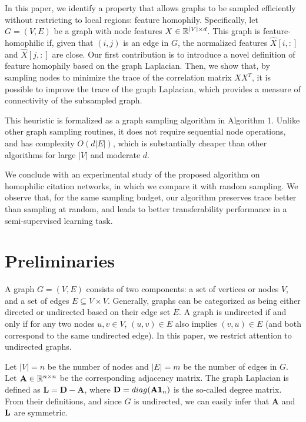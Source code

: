 \documentclass[conference]{IEEEtran}
\theoremstyle{definition}
\begin{document}
In this paper, we identify a property that allows graphs to be sampled efficiently without restricting to local regions: feature homophily. Specifically, let $G=(V,E)$ be a graph with node features $X \in {\mathbb R}^{|V| \times d}$. This graph is feature-homophilic if, given that $(i,j)$ is an edge in $G$, the normalized features $\hat{X}[i,:]$ and $\hat{X}[j,:]$ are close. Our first contribution is to introduce a novel definition of feature homophily based on the graph Laplacian. Then, we show that, by sampling nodes to minimize the trace of the correlation matrix $XX^T$, it is possible to improve the trace of the graph Laplacian, which provides a measure of connectivity of the subsampled graph. 

This heuristic is formalized as a graph sampling algorithm in Algorithm 1. Unlike other graph sampling routines, it does not require sequential node operations, and has complexity $O(d|E|)$, which is substantially cheaper than other algorithms for large $|V|$ and moderate $d$. 

We conclude with an experimental study of the proposed algorithm on homophilic citation networks, in which we compare it with random sampling. We observe that, for the same sampling budget, our algorithm preserves trace better than sampling at random, and leads to better transferability performance in a semi-supervised learning task.

\section{Preliminaries}

A graph $G=(V,E)$ consists of two components: a set of vertices or nodes $V$, and a set of edges $E \subseteq V \times V$. Generally, graphs can be categorized as being either directed or undirected based on their edge set $E$. A graph is undirected if and only if for any two nodes $u,v \in V$, $(u,v) \in E$ also implies $(v,u) \in E$ (and both correspond to the same undirected edge). In this paper, we restrict attention to undirected graphs.

Let $|V|=n$ be the number of nodes and $|E|=m$ be the number of edges in $G$. Let $\mathbf{A} \in {\mathbb R}^{n \times n}$ be the corresponding adjacency matrix.
The graph Laplacian is defined as $\mathbf{L} = \mathbf{D} - \mathbf{A}$, where ${\mathbf D}=\relax{diag}({\mathbf A}\boldsymbol{1}_n)$ is the so-called degree matrix. From their definitions, and since $G$ is undirected, we can easily infer that $\mathbf{A}$ and ${\mathbf L}$ are symmetric.
\end{document}
